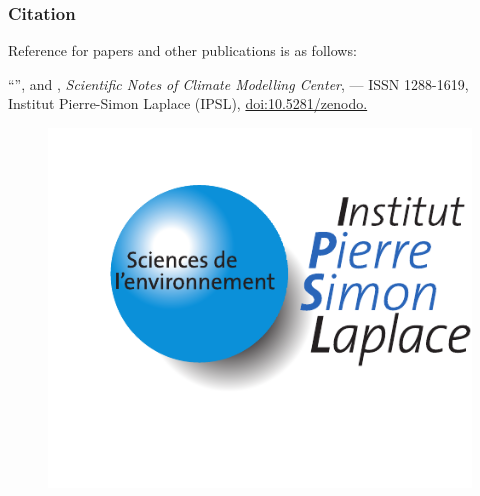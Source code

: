 \subsubsection*{Citation}

Reference for papers and other publications is as follows:

\vspace{0.5cm}

\sloppy
``{\bfseries \heading}'', 
\firstauthor and \secondauthor, 
{\em Scientific Notes of Climate Modelling Center}, \textbf{\ipslnum} --- ISSN 1288-1619, 
Institut Pierre-Simon Laplace (IPSL), 
\href{https://doi.org/10.5281/zenodo.\zid}{doi:10.5281/zenodo.\zid}

\begin{figure}[b]
  \begin{minipage}[c]{0.72\textwidth}
    \small{}
  \end{minipage}
  \hfill
  \begin{minipage}[c]{0.25\textwidth}
    \href{http://www.cmc.ipsl.fr}{\includegraphics[width=\textwidth]{logos/IPSL_upright}}
  \end{minipage}
\end{figure}

